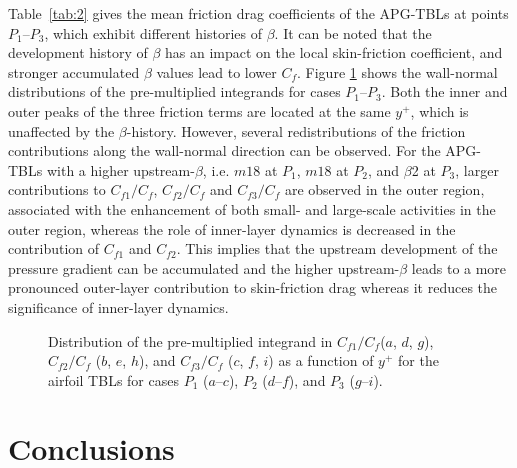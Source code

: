 Table~\ref{tab:2} gives the mean friction drag coefficients of the APG-TBLs at points $P_1$--$P_3$, which exhibit different histories of $\beta$. It can be noted that the development history of $\beta$ has an impact on the local skin-friction coefficient, and stronger accumulated $\beta$ values lead to lower $C_f$.
Figure \ref{history} shows the wall-normal distributions of the pre-multiplied integrands for cases $P_1$--$P_3$. Both the inner and outer peaks of the three friction terms are located at the same $y^+$, which is unaffected by the $\beta$-history. 
However, several redistributions of the friction contributions along the wall-normal direction can be observed. For the APG-TBLs with a higher upstream-$\beta$, i.e. $m18$ at $P_1$, $m18$ at $P_2$, and $\beta$2 at $P_3$, larger contributions to $C_{f1}/C_f$, $C_{f2}/C_f$ and $C_{f3}/C_f$ are observed in the outer region, associated with the enhancement of both small- and large-scale activities in the outer region, whereas the role of inner-layer dynamics is decreased in the contribution of $C_{f1}$ and $C_{f2}$.
This implies that the upstream development of the pressure gradient can be accumulated and the higher upstream-$\beta$ leads to a more pronounced outer-layer contribution to skin-friction drag whereas it reduces the significance of inner-layer dynamics.



\begin{figure}[htb]
\subfigure{\texttt{[image: 12a]}}
\subfigure{\texttt{[image: 12b]}}
\subfigure{\texttt{[image: 12c]}}
\subfigure{\texttt{[image: 12d]}}
\subfigure{\texttt{[image: 12e]}}
\subfigure{\texttt{[image: 12f]}}
\subfigure{\texttt{[image: 12g]}}
\subfigure{\texttt{[image: 12h]}}
\subfigure{\texttt{[image: 12i]}}
\caption{Distribution of the pre-multiplied integrand in $C_{f1}/C_f$($a$, $d$, $g$), $C_{f2}/C_f$ ($b$, $e$, $h$), and $C_{f3}/C_f$ ($c$, $f$, $i$) as a function of $y^+$ for the airfoil TBLs for cases $P_1$ ($a$--$c$), $P_2$ ($d$--$f$), and $P_3$ ($g$--$i$).}
\label{history}
\end{figure}






\section{Conclusions}\label{conclusion}

